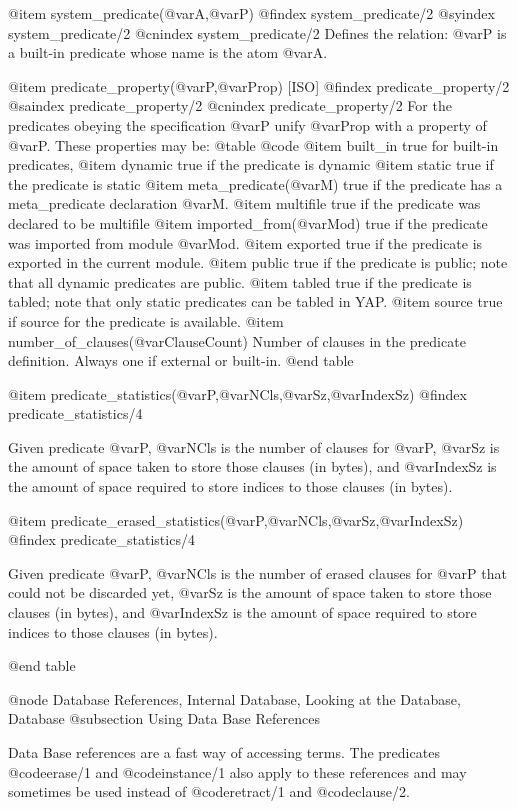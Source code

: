 {{{{{@item system_predicate(@var{A},@var{P})
@findex system_predicate/2
@syindex system_predicate/2
@cnindex system_predicate/2
Defines the relation:  @var{P} is a built-in predicate whose name
is the atom @var{A}.

@item predicate_property(@var{P},@var{Prop}) [ISO]
@findex predicate_property/2
@saindex predicate_property/2
@cnindex predicate_property/2
For the predicates obeying the specification @var{P} unify @var{Prop}
with a property of @var{P}. These properties may be:
@table @code
@item built_in
true for built-in predicates,
@item dynamic
true if the predicate is dynamic
@item static
true if the predicate is static
@item meta_predicate(@var{M})
true if the predicate has a meta_predicate declaration @var{M}.
@item multifile
true if the predicate was declared to be multifile
@item imported_from(@var{Mod})
true if the predicate was imported from module @var{Mod}.
@item exported
true if the predicate is exported in the current module.
@item public
true if the predicate is public; note that all dynamic predicates are
public.
@item tabled
true if the predicate is tabled; note that only static predicates can
be tabled in YAP.
@item source
true if source for the predicate is available.
@item number_of_clauses(@var{ClauseCount})
Number of clauses in the predicate definition. Always one if external
or built-in.
@end table

@item predicate_statistics(@var{P},@var{NCls},@var{Sz},@var{IndexSz}) 
@findex predicate_statistics/4

Given predicate @var{P}, @var{NCls} is the number of clauses for
@var{P}, @var{Sz} is the amount of space taken to store those clauses
(in bytes), and @var{IndexSz} is the amount of space required to store
indices to those clauses (in bytes).

@item predicate_erased_statistics(@var{P},@var{NCls},@var{Sz},@var{IndexSz}) 
@findex predicate_statistics/4

Given predicate @var{P}, @var{NCls} is the number of erased clauses for
@var{P} that could not be discarded yet, @var{Sz} is the amount of space
taken to store those clauses (in bytes), and @var{IndexSz} is the amount
of space required to store indices to those clauses (in bytes).

@end table

@node Database References, Internal Database, Looking at the Database, Database
@subsection Using Data Base References

Data Base references are a fast way of accessing terms. The predicates
@code{erase/1} and @code{instance/1} also apply to these references and may
sometimes be used instead of @code{retract/1} and @code{clause/2}.

}}}}}
